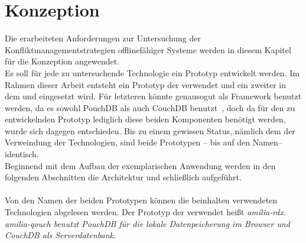 \chapter{\label{chap:konzeption}Konzeption}
Die erarbeiteten Anforderungen zur Untersuchung der Konfliktmanagementstrategien offlinefähiger Systeme werden in diesem Kapitel für die Konzeption angewendet.\\
Es soll für jede zu untersuchende Technologie ein Prototyp entwickelt werden. Im Rahmen dieser Arbeit entsteht ein Prototyp der  verwendet und ein zweiter in dem  und  eingesetzt wird. Für letzteren könnte genausogut  als Framework benutzt werden, da es sowohl PouchDB als auch CouchDB benutzt~\cite{hoodie-how}, doch da für den zu entwickelnden Prototyp lediglich diese beiden Komponenten benötigt werden, wurde sich dagegen entschieden.
 Bis zu einem gewissen Status, nämlich dem der Verweindung der Technologien, sind beide Prototypen -- bis auf den Namen-- identisch.\\
Beginnend mit dem Aufbau der exemplarischen Anwendung werden in den folgenden Abschnitten die  Architektur  und schließlich  aufgeführt.\\\\
Von den Namen der beiden Prototypen können die beinhalten verwendeten Technologien abgelesen werden. Der Prototyp der  verwendet heißt \it{amilia-rdx}. \it{amilia-qouch} benutzt PouchDB für die lokale Datenpeicherung im Browser und CouchDB als Serverdatenbank.
%
%
